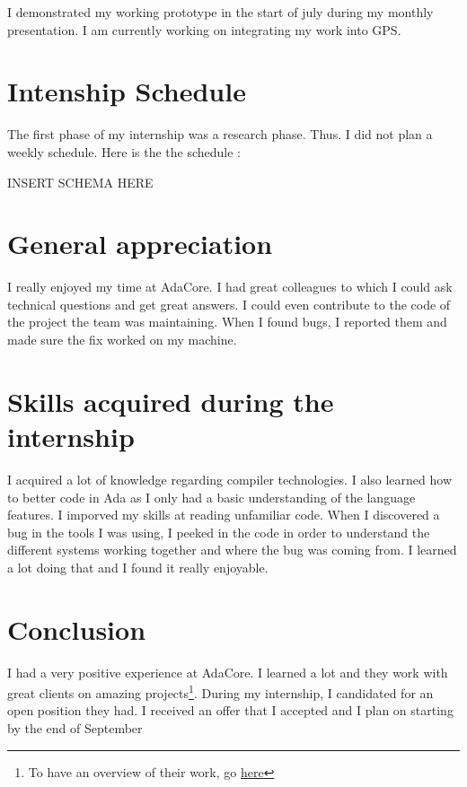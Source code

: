 \documentclass[12pt,]{article}
\begin{document}
I demonstrated my working prototype in the start of july during my
monthly presentation. I am currently working on integrating my work into
GPS.

\hypertarget{intenship-schedule}{%
\section{Intenship Schedule}\label{intenship-schedule}}

The first phase of my internship was a research phase. Thus. I did not
plan a weekly schedule. Here is the the schedule :

INSERT SCHEMA HERE

\hypertarget{general-appreciation}{%
\section{General appreciation}\label{general-appreciation}}

I really enjoyed my time at AdaCore. I had great colleagues to which I
could ask technical questions and get great answers. I could even
contribute to the code of the project the team was maintaining. When I
found bugs, I reported them and made sure the fix worked on my machine.

\hypertarget{skills-acquired-during-the-internship}{%
\section{Skills acquired during the
internship}\label{skills-acquired-during-the-internship}}

I acquired a lot of knowledge regarding compiler technologies. I also
learned how to better code in Ada as I only had a basic understanding of
the language features. I imporved my skills at reading unfamiliar code.
When I discovered a bug in the tools I was using, I peeked in the code
in order to understand the different systems working together and where
the bug was coming from. I learned a lot doing that and I found it
really enjoyable.

\hypertarget{conclusion}{%
\section{Conclusion}\label{conclusion}}

I had a very positive experience at AdaCore. I learned a lot and they
work with great clients on amazing projects\footnote{To have an overview
  of their work, go \href{https://www.adacore.com/industries}{here}}.
During my internship, I candidated for an open position they had. I
received an offer that I accepted and I plan on starting by the end of
September



\nocite{pizza}
\end{document}
